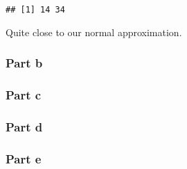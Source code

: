 \documentclass[]{article}
\begin{document}
\begin{verbatim}
## [1] 14 34
\end{verbatim}

Quite close to our normal approximation.

\hypertarget{part-b}{%
\subsubsection{Part b}\label{part-b}}

\hypertarget{part-c}{%
\subsubsection{Part c}\label{part-c}}

\hypertarget{part-d}{%
\subsubsection{Part d}\label{part-d}}

\hypertarget{part-e}{%
\subsubsection{Part e}\label{part-e}}
\end{document}
